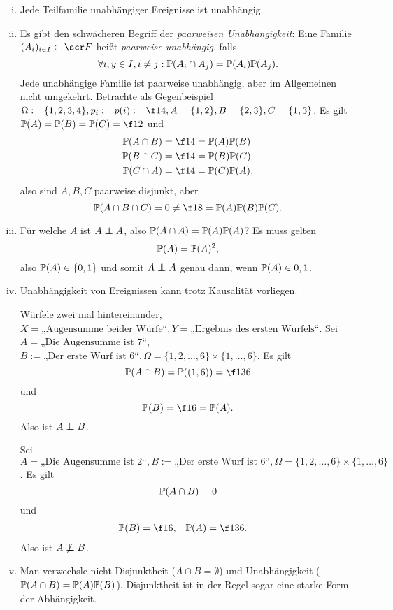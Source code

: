 \begin{nt} \label{1.5.10}
	\begin{enumerate}[(i)]
		\item
			Jede Teilfamilie unabhängiger Ereignisse ist unabhängig.
		\item
			Es gibt den schwächeren Begriff der \emph{paarweisen Unabhängigkeit}:
			Eine Familie $(A_i)_{i\in I} \subset \scr F$ heißt \emph{paarweise unabhängig}, falls
			\[
				\forall i,y \in I, i \neq j :
				\P(A_i \cap A_j) = \P(A_i) \P(A_j).
			\]
			Jede unabhängige Familie ist paarweise unabhängig, aber im Allgemeinen nicht umgekehrt.
			Betrachte als Gegenbeispiel $\Omega := \{1,2,3,4\}, p_i := p(i) := \f 14, A = \{1,2\}, B = \{2,3\}, C = \{1,3\}$.
			Es gilt $\P(A) = \P(B) = \P(C) = \f 12$ und
			\begin{align*}
				\P(A \cap B) &= \f 14 = \P(A) \P(B) \\
				\P(B \cap C) &= \f 14 = \P(B) \P(C) \\
				\P(C \cap A) &= \f 14 = \P(C) \P(A),
			\end{align*}
			also sind $A,B,C$ paarweise disjunkt, aber
			\[
				\P(A\cap B \cap C) = 0 \neq \f 18 = \P(A)\P(B)\P(C).
			\]
		\item
			Für welche $A$ ist $A \indep A$, also $\P(A \cap A) = \P(A) \P(A)$?
			Es muss gelten
			\[
				\P(A) = \P(A)^2,
			\]
			also $\P(A) \in \{0,1\}$ und somit $A \indep A$ genau dann, wenn $\P(A) \in {0,1}$.
		\item
			Unabhängigkeit von Ereignissen kann trotz Kausalität vorliegen.

			Würfele zwei mal hintereinander, $X = \text{„Augensumme beider Würfe“}, Y = \text{„Ergebnis des ersten Wurfels“}$.
			Sei $A = \text{„Die Augensumme ist 7“}$, $B := \text{„Der erste Wurf ist 6“}, \Omega = \{1,2,\dotsc, 6\} \times \{1, \dotsc, 6\}$.
			Es gilt
			\[
				\P(A\cap B)
				= \P({(1,6)})
				= \f 1{36}
			\]
			und
			\[
				\P(B) = \f 16 = \P(A).
			\]
			Also ist $A \indep B$.

			Sei $A = \text{„Die Augensumme ist 2“}, B := \text{„Der erste Wurf ist 6“}, \Omega = \{1,2,\dotsc, 6\} \times \{1, \dotsc, 6\}$.
			Es gilt
			\[
				\P(A\cap B)
				= 0
			\]
			und
			\begin{align*}
				\P(B) &= \f 16, &
				\P(A) &= \f 1{36}.
			\end{align*}
			Also ist $A \not\indep B$.
		\item
			Man verwechsle nicht Disjunktheit ($A \cap B = \emptyset$) und Unabhängigkeit ($\P(A\cap B) = \P(A)\P(B)$).
			Disjunktheit ist in der Regel sogar eine starke Form der Abhängigkeit.


\end{enumerate}
\end{nt}
